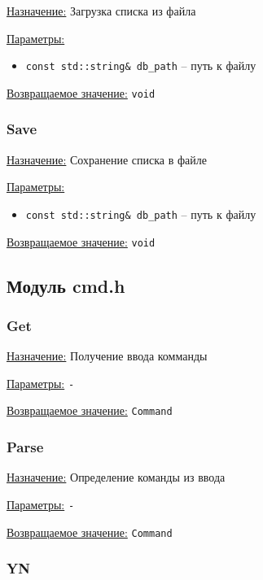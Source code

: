\underline{Назначение:} Загрузка списка из файла

\underline{Параметры:} 

\begin{itemize}
    \item \verb|const std::string& db_path| -- путь к файлу
\end{itemize}

\underline{Возвращаемое значение:} \verb|void|


\subsubsection*{Save}

\underline{Назначение:} Сохранение списка в файле

\underline{Параметры:} 

\begin{itemize}
    \item \verb|const std::string& db_path| -- путь к файлу
\end{itemize}

\underline{Возвращаемое значение:} \verb|void|


\subsection*{Модуль cmd.h}


\subsubsection*{Get}

\underline{Назначение:} Получение ввода комманды

\underline{Параметры:} \verb|-|

\underline{Возвращаемое значение:} \verb|Command|


\subsubsection*{Parse}

\underline{Назначение:} Определение команды из ввода

\underline{Параметры:} \verb|-|

\underline{Возвращаемое значение:} \verb|Command|


\subsubsection*{YN}

